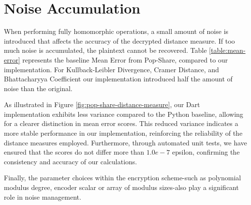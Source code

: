 \section{Noise Accumulation}

When performing fully homomorphic operations, a small amount of noise is introduced that affects the accuracy of the decrypted distance measure. If too much noise is accumulated, the plaintext cannot be recovered. Table \ref{table:mean-error} represents the baseline Mean Error from Pop-Share, compared to our implementation. For Kullback-Leibler Divergence, Cramer Distance, and Bhattacharyya Coefficient our implementation introduced half the amount of noise than the original.



As illustrated in Figure \ref{fig:pop-share-distance-measure}, our Dart implementation exhibits less variance compared to the Python baseline, allowing for a clearer distinction in mean error scores. This reduced variance indicates a more stable performance in our implementation, reinforcing the reliability of the distance measures employed. Furthermore, through automated unit tests, we have ensured that the scores do not differ more than $1.0e-7$ epsilon, confirming the consistency and accuracy of our calculations.

Finally, the parameter choices within the encryption scheme-such as polynomial modulus degree, encoder scalar or array of modulus sizes-also play a significant role in noise management.
